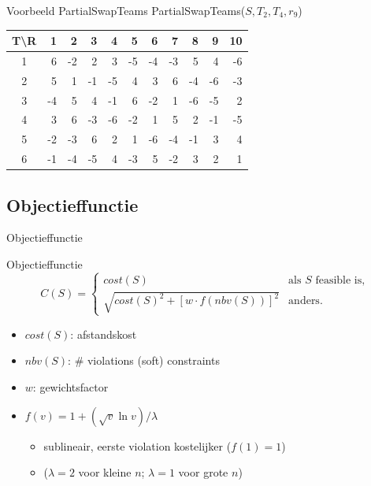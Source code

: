 \documentclass{beamer}
\begin{document}
\begin{frame}{Voorbeeld PartialSwapTeams}
PartialSwapTeams($S,T_2,T_4,r_9$)

  \begin{center} \footnotesize
 \begin{tabular}{c | *{10}{r} }
  \textbf{T\textbackslash{}R} & 1 & 2 &3 & 4 & 5 & 6 & 7 & 8 & 9 & 10 \\ \hline
 1 &     6&-2&\alert{2}&3&-5&-4&-3&5&\alert{4}&-6 \\
 2 &    5&1&\alert{-1}&\alert{-5}&4&3&6&-4&\alert{-6}&\alert{-3}\\
 3 &    -4&5&\alert{4}&-1&6&-2&1&-6&-5&\alert{2}\\
 4 &    3&6&\alert{-3}&\alert{-6}&-2&1&5&2&\alert{-1}&\alert{-5}\\
 5&    -2&-3&6&\alert{2}&1&-6&-4&-1&3&\alert{4}\\
 6 &  -1&-4&-5&\alert{4}&-3&5&-2&3&\alert{2}&1 \\
 \end{tabular}
 \end{center}

\end{frame}

\subsection*{Objectieffunctie}
\begin{frame}{Objectieffunctie}

Objectieffunctie
 \begin{equation*}
  C(S)=%
  \begin{cases}
    cost(S) &\textrm{als $S$ feasible is,} \\
    \sqrt{cost(S)^2 + [w\cdot{}f(nbv(S))]^2} &\textrm{anders}.
  \end{cases}
\end{equation*} \pause

\begin{itemize}[<+->]
 \item $cost(S)$: afstandskost
\item $nbv(S)$: \# violations (soft) constraints
 \item $w$: gewichtsfactor
\item $f(v)=1+(\sqrt{v}\ln{v})/\lambda$
\begin{itemize}
\item sublineair, eerste violation kostelijker ($f(1) = 1$)
\item \footnotesize{($\lambda{}=2$ voor kleine $n$; $\lambda{}=1$ voor grote $n$)}
\end{itemize}
\end{itemize}
\end{frame}
\end{document}
